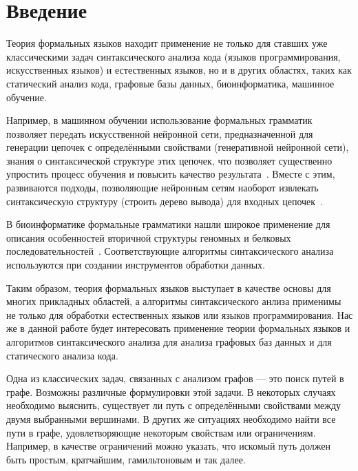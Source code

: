 \chapter*{Введение}

Теория формальных языков находит применение не только для ставших уже классическими задач синтаксического анализа кода (языков программирования, искусственных языков) и естественных языков, но и в других областях, таких как статический анализ кода, графовые базы данных, биоинформатика, машинное обучение.

Например, в машинном обучении использование формальных грамматик позволяет передать искусственной нейронной сети, предназначенной для генерации цепочек с определёнными свойствами (генеративной нейронной сети), знания о синтаксической структуре этих цепочек, что позволяет существенно упростить процесс обучения и повысить качество результата~\cite{10.5555/3305381.3305582}.
Вместе с этим, развиваются подходы, позволяющие нейронным сетям наоборот извлекать синтаксическую структуру (строить дерево вывода) для входных цепочек~\cite{kasai-etal-2017-tag,kasai-etal-2018-end}.

В биоинформатике формальные грамматики нашли широкое применение для описания особенностей вторичной структуры геномных и белковых последовательностей~\cite{Dyrka2019,WJAnderson2012,zier2013rna}.
Соответствующие алгоритмы синтаксического анализа используются при создании инструментов обработки данных.

Таким образом, теория формальных языков выступает в качестве основы для многих прикладных областей, а алгоритмы синтаксического анлиза применимы не только для обработки естественных языков или языков программирования.
Нас же в данной работе будет интересовать применение теории формальных языков и алгоритмов синтаксического анализа для анализа графовых баз данных и для статического анализа кода.

Одна из классических задач, связанных с анализом графов --- это поиск путей в графе.
Возможны различные формулировки этой задачи.
В некоторых случаях необходимо выяснить, существует ли путь с определёнными свойствами между двумя выбранными вершинами.
В других же ситуациях необходимо найти все пути в графе, удовлетворяющие некоторым свойствам или ограничениям.
Например, в качестве ограничений можно указать, что искомый путь должен быть простым, кратчайшим, гамильтоновым и так далее.

